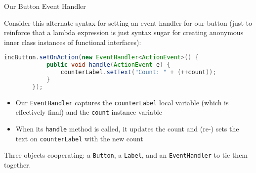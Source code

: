 \documentclass{beamer}
\begin{document}
\begin{frame}[fragile]{Our Button Event Handler}

Consider this alternate syntax for setting an event handler for our button (just to reinforce that a lambda expression is just syntax sugar for creating anonymous inner class instances of functional interfaces):
\begin{lstlisting}[language=Java]
        incButton.setOnAction(new EventHandler<ActionEvent>() {
            public void handle(ActionEvent e) {
                counterLabel.setText("Count: " + (++count));
            }
        });
\end{lstlisting}

\begin{itemize}
\item Our {\tt EventHandler} captures the {\tt counterLabel} local variable (which is effectively final) and the {\tt count} instance variable
\item When its {\tt handle} method is called, it updates the count and (re-) sets the text on {\tt counterLabel} with the new count
\end{itemize}
Three objects cooperating: a {\tt Button}, a {\tt Label}, and an {\tt EventHandler}  to tie them together.

\end{frame}

%
%
%
%
%
%
%
%
%
%
%
\end{document}
